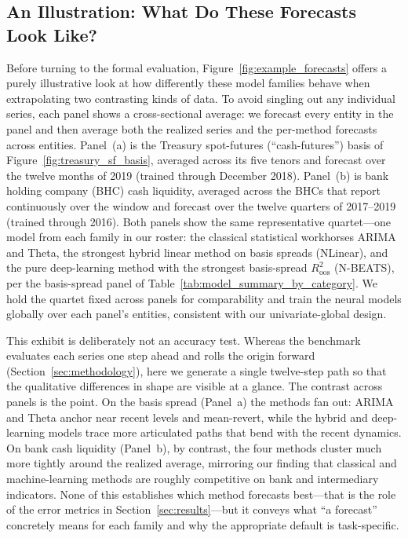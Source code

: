 \documentclass{article}
\begin{document}
\subsection{An Illustration: What Do These Forecasts Look Like?}
\label{subsec:forecast_illustration}

Before turning to the formal evaluation, Figure~\ref{fig:example_forecasts} offers a purely illustrative look at how differently these model families behave when extrapolating two contrasting kinds of data. To avoid singling out any individual series, each panel shows a cross-sectional average: we forecast every entity in the panel and then average both the realized series and the per-method forecasts across entities. Panel~(a) is the Treasury spot-futures (``cash-futures'') basis of Figure~\ref{fig:treasury_sf_basis}, averaged across its five tenors and forecast over the twelve months of 2019 (trained through December 2018). Panel~(b) is bank holding company (BHC) cash liquidity, averaged across the BHCs that report continuously over the window and forecast over the twelve quarters of 2017--2019 (trained through 2016). Both panels show the same representative quartet---one model from each family in our roster: the classical statistical workhorses ARIMA and Theta, the strongest hybrid linear method on basis spreads (NLinear), and the pure deep-learning method with the strongest basis-spread $R^2_{\text{oos}}$ (N-BEATS), per the basis-spread panel of Table~\ref{tab:model_summary_by_category}. We hold the quartet fixed across panels for comparability and train the neural models globally over each panel's entities, consistent with our univariate-global design.

This exhibit is deliberately not an accuracy test. Whereas the benchmark evaluates each series one step ahead and rolls the origin forward (Section~\ref{sec:methodology}), here we generate a single twelve-step path so that the qualitative differences in shape are visible at a glance. The contrast across panels is the point. On the basis spread (Panel~a) the methods fan out: ARIMA and Theta anchor near recent levels and mean-revert, while the hybrid and deep-learning models trace more articulated paths that bend with the recent dynamics. On bank cash liquidity (Panel~b), by contrast, the four methods cluster much more tightly around the realized average, mirroring our finding that classical and machine-learning methods are roughly competitive on bank and intermediary indicators. None of this establishes which method forecasts best---that is the role of the error metrics in Section~\ref{sec:results}---but it conveys what ``a forecast'' concretely means for each family and why the appropriate default is task-specific.
\end{document}
